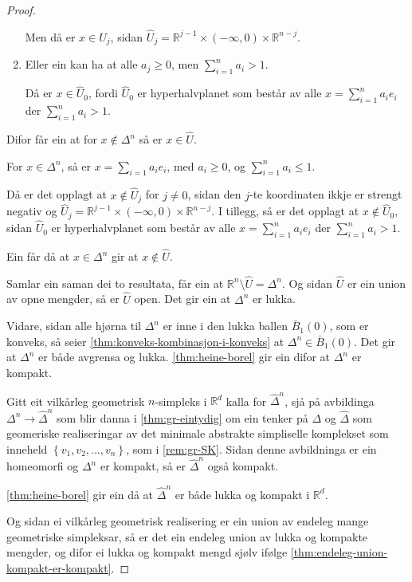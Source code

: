 \documentclass[a4paper, 12pt, norsk]{article}
\theoremstyle{plain}
\theoremstyle{definition}
\newcommand{\Rb}{\mathbb{R}}
\newcommand{\set}[1]{ \left\{ #1 \right\} } %
\begin{document}
\begin{proof}
\begin{enumerate}
{				Men då er \( x \in \hat{U}_j \), sidan \( \hat{U}_j = \Rb^{j-1}\times(-\infty, 0) \times \Rb^{n-j} \). }
  		\item { Eller ein kan ha at alle \( a_j \geq 0 \), men \( \sum_{i=1}^n a_i > 1 \). 
		
				 Då er \( x \in \hat{U}_0 \), fordi \( \hat{U}_0 \) er hyperhalvplanet som består av alle \( x = \sum_{i = 1}^n a_i e_i \) der \( \sum_{i = 1}^n a_i > 1 \). }
	\end{enumerate}

	Difor får ein at for \( x \not\in \Delta^n \) så er \( x \in \hat{U} \).

	For \( x \in \Delta^n \), så er \( x = \sum_{i=1} a_i e_i \), med \( a_i \geq 0 \), og \( \sum_{i=1}^n a_i \leq 1 \).

	Då er det opplagt at \( x \not\in \hat{U}_j \) for \( j \neq 0 \), sidan den \( j \)-te koordinaten ikkje er strengt negativ og \( \hat{U}_j = \Rb^{j-1}\times(-\infty, 0) \times \Rb^{n-j} \). I tillegg, så er det opplagt at \( x \not\in \hat{U}_0 \), sidan \( \hat{U}_0 \) er hyperhalvplanet som består av alle \( x = \sum_{i = 1}^n a_i e_i \) der \( \sum_{i = 1}^n a_i > 1 \).

	Ein får då at \( x \in \Delta^n \) gir at \( x \not\in \hat{U} \).

	Samlar ein saman dei to resultata, får ein at \( \Rb^n \setminus \hat{U} = \Delta^n \). Og sidan \( \hat{U} \) er ein union av opne mengder, så er \( \hat{U} \) open. Det gir ein at \( \Delta^n \) er lukka.

	Vidare, sidan alle hjørna til \( \Delta^n \) er inne i den lukka ballen \( \bar{B}_{1}(0) \), som er konveks, så seier \autoref{thm:konveks-kombinasjon-i-konveks} at \( \Delta^n \in \bar{B}_{1}(0) \). Det gir at \( \Delta^n \) er både avgrensa og lukka. \autoref{thm:heine-borel} gir ein difor at \( \Delta^n \) er kompakt.

	Gitt eit vilkårleg geometrisk \( n \)-simpleks i \( \Rb^d \) kalla for \( \hat{\Delta}^n \), sjå på avbildinga \( \Delta^n \to \hat{\Delta}^n \) som blir danna i \autoref{thm:gr-eintydig} om ein tenker på \( \Delta \) og \( \hat{\Delta} \) som geomeriske realiseringar av det minimale abstrakte simpliselle komplekset som inneheld \( \set{v_1, v_2, \dots, v_n} \), som i \autoref{rem:gr-SK}. Sidan denne avbildninga er ein homeomorfi og \( \Delta^n \) er kompakt, så er \( \hat{\Delta}^n \) også kompakt.

	\autoref{thm:heine-borel} gir ein då at \( \hat{\Delta}^n \) er både lukka og kompakt i \( \Rb^d \).

	Og sidan ei vilkårleg geometrisk realisering er ein union av endeleg mange geometriske simpleksar, så er det ein endeleg union av lukka og kompakte mengder, og difor ei lukka og kompakt mengd sjølv ifølge \autoref{thm:endeleg-union-kompakt-er-kompakt}.
\end{proof}
\end{document}
